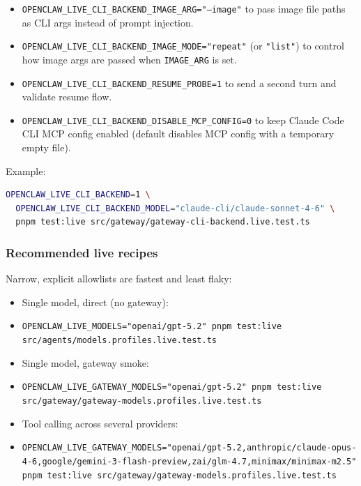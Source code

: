 \begin{itemize}
  \item \texttt{OPENCLAW\_LIVE\_CLI\_BACKEND\_IMAGE\_ARG="--image"} to pass image file paths as CLI args instead of prompt injection.
  \item \texttt{OPENCLAW\_LIVE\_CLI\_BACKEND\_IMAGE\_MODE="repeat"} (or \texttt{"list"}) to control how image args are passed when \texttt{IMAGE\_ARG} is set.
  \item \texttt{OPENCLAW\_LIVE\_CLI\_BACKEND\_RESUME\_PROBE=1} to send a second turn and validate resume flow.
  \item \texttt{OPENCLAW\_LIVE\_CLI\_BACKEND\_DISABLE\_MCP\_CONFIG=0} to keep Claude Code CLI MCP config enabled (default disables MCP config with a temporary empty file).
\end{itemize}


Example:

\begin{lstlisting}[language=bash]
OPENCLAW_LIVE_CLI_BACKEND=1 \
  OPENCLAW_LIVE_CLI_BACKEND_MODEL="claude-cli/claude-sonnet-4-6" \
  pnpm test:live src/gateway/gateway-cli-backend.live.test.ts
\end{lstlisting}


\subsubsection{Recommended live recipes}


Narrow, explicit allowlists are fastest and least flaky:

\begin{itemize}
  \item Single model, direct (no gateway):
  \item \texttt{OPENCLAW\_LIVE\_MODELS="openai/gpt-5.2" pnpm test:live src/agents/models.profiles.live.test.ts}
\end{itemize}


\begin{itemize}
  \item Single model, gateway smoke:
  \item \texttt{OPENCLAW\_LIVE\_GATEWAY\_MODELS="openai/gpt-5.2" pnpm test:live src/gateway/gateway-models.profiles.live.test.ts}
\end{itemize}


\begin{itemize}
  \item Tool calling across several providers:
  \item \texttt{OPENCLAW\_LIVE\_GATEWAY\_MODELS="openai/gpt-5.2,anthropic/claude-opus-4-6,google/gemini-3-flash-preview,zai/glm-4.7,minimax/minimax-m2.5" pnpm test:live src/gateway/gateway-models.profiles.live.test.ts}
\end{itemize}


